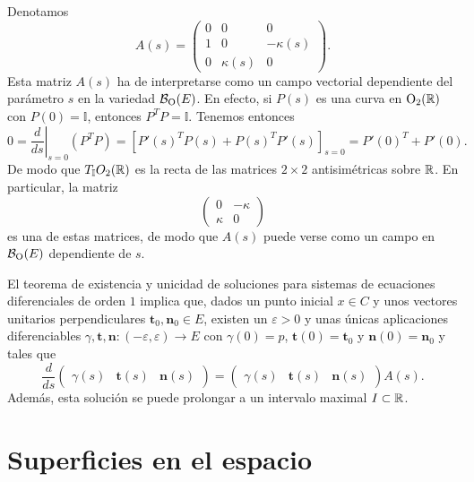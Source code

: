 \documentclass[11pt,a4paper]{amsbook}
\theoremstyle{remark} \newtheorem{rmk}[subsection]{Observación}
\theoremstyle{definition} \newtheorem{defn}[subsection]{Definición}
\theoremstyle{definition} \newtheorem{ex}[subsection]{Ejemplo}
\theoremstyle{definition} \newtheorem{ej}[subsection]{Ejercicio}
\begin{document}
Denotamos
\begin{equation*}
  A(s)=
\begin{pmatrix}
  0 & 0 & 0 \\
  1 & 0 & -\kappa(s) \\
  0 & \kappa(s) & 0
\end{pmatrix}.
\end{equation*}
Esta matriz $A(s)$ ha de interpretarse como un campo vectorial dependiente del parámetro $s$ en la variedad $\mathcal B_{\mathrm{O}}(E)$. En efecto, si $P(s)$ es una curva en $\mathrm{O}_2(\mathbb R)$ con $P(0)=\mathbb{I}$, entonces $P^T P =\mathbb{I}$. Tenemos entonces
\begin{equation*}
0=\left. \frac{d}{ds} \right|_{s=0} (P^T P) = [P'(s)^T P(s) + P(s)^T P'(s)]_{s=0} = P'(0)^T + P'(0).
\end{equation*}
De modo que $T_{\mathbb{I}} O_2(\mathbb R)$ es la recta de las matrices $2\times 2$ antisimétricas sobre $\mathbb R$. En particular, la matriz
\begin{equation*}
\begin{pmatrix}
  0 & - \kappa \\
  \kappa & 0
\end{pmatrix}
\end{equation*}
es una de estas matrices, de modo que $A(s)$ puede verse como un campo en $\mathcal B_{\mathrm{O}}(E)$ dependiente de $s$.

El teorema de existencia y unicidad de soluciones para sistemas de ecuaciones diferenciales de orden $1$ implica que, dados un punto inicial $x\in C$ y unos vectores unitarios perpendiculares $\bm{t}_0,\bm{n}_0 \in E$, existen un $\varepsilon > 0$ y unas únicas aplicaciones diferenciables $\gamma,\bm{t},\bm{n}:(-\varepsilon,\varepsilon)\rightarrow E$ con $\gamma(0)=p$, $\bm{t}(0)=\bm{t}_0$ y $\bm{n}(0)=\bm{n}_0$ y tales que
\begin{equation*}
\frac{d}{ds}\begin{pmatrix}
\gamma(s) & \bm{t}(s) & \bm{n}(s)
\end{pmatrix} = \begin{pmatrix}
\gamma(s) & \bm{t}(s) & \bm{n}(s)
\end{pmatrix} A(s).
\end{equation*}
Además, esta solución se puede prolongar a un intervalo maximal $I \subset \mathbb R$.

\section{Superficies en el espacio}
\end{document}
